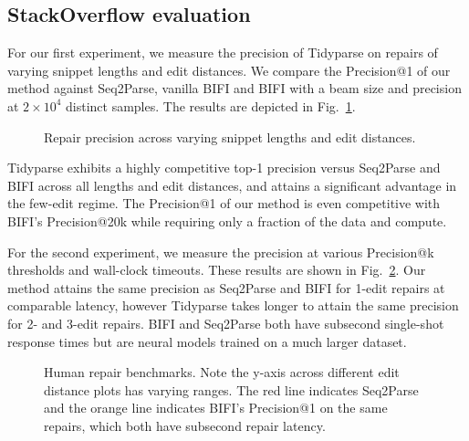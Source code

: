 \documentclass[runningheads]{llncs}
\begin{document}

\subsection{StackOverflow evaluation}\label{sec:rq2}

For our first experiment, we measure the precision of Tidyparse on repairs of varying snippet lengths and edit distances. We compare the Precision@1 of our method against Seq2Parse, vanilla BIFI and BIFI with a beam size and precision at $2\times10^4$ distinct samples. The results are depicted in Fig.~\ref{fig:len_dist_prec}.

\begin{figure}[h!]
  \resizebox{.24\textwidth}{!}{}
  \resizebox{.24\textwidth}{!}{}
  \resizebox{.24\textwidth}{!}{}
  \resizebox{.24\textwidth}{!}{}
  \caption{Repair precision across varying snippet lengths and edit distances.}\label{fig:len_dist_prec}
\end{figure}

Tidyparse exhibits a highly competitive top-1 precision versus Seq2Parse and BIFI across all lengths and edit distances, and attains a significant advantage in the few-edit regime. The Precision@1 of our method is even competitive with BIFI's Precision@20k while requiring only a fraction of the data and compute.

For the second experiment, we measure the precision at various Precision@k thresholds and wall-clock timeouts. These results are shown in Fig.~\ref{fig:human}. Our method attains the same precision as Seq2Parse and BIFI for 1-edit repairs at comparable latency, however Tidyparse takes longer to attain the same precision for 2- and 3-edit repairs. BIFI and Seq2Parse both have subsecond single-shot response times but are neural models trained on a much larger dataset.

\begin{figure}[h!]
  \resizebox{.24\textwidth}{!}{}
  \resizebox{.24\textwidth}{!}{}
  \resizebox{.24\textwidth}{!}{}
  \resizebox{.24\textwidth}{!}{}
  \caption{Human repair benchmarks. Note the y-axis across different edit distance plots has varying ranges. The red line indicates Seq2Parse and the orange line indicates BIFI's Precision@1 on the same repairs, which both have subsecond repair latency.}\label{fig:human}
\end{figure}
\end{document}
